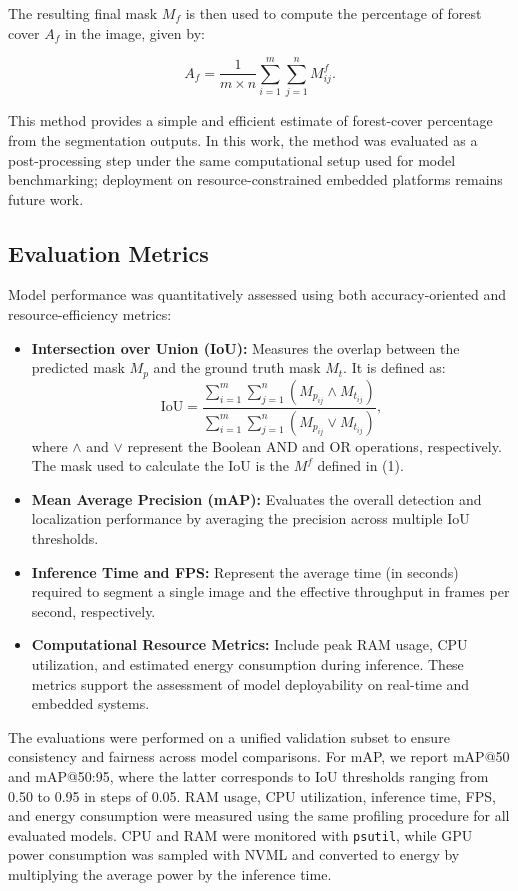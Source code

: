\documentclass[journal,article,submit,pdftex,moreauthors]{Definitions/mdpi}
\begin{document}
The resulting final mask $M_f$ is then used to compute the percentage of forest
cover $A_f$ in the image, given by:

\begin{equation}
    A_f = \frac{1}{m\times n}\sum_{i=1}^{m} \sum_{j=1}^{n} M_{ij}^f.
\end{equation}

This method provides a simple and efficient estimate of forest-cover percentage
from the segmentation outputs. In this work, the method was evaluated as a
post-processing step under the same computational setup used for model
benchmarking; deployment on resource-constrained embedded platforms remains
future work.

\subsection{Evaluation Metrics}

Model performance was quantitatively assessed using both accuracy-oriented and resource-efficiency metrics:
\begin{itemize}
    \item \textbf{Intersection over Union (IoU):} Measures the overlap between the predicted mask $M_p$ and the ground truth mask $M_t$. It is defined as:
    \[
    \text{IoU} = \frac{\sum_{i=1}^{m} \sum_{j=1}^{n} (M_{p_{ij}} \land M_{t_{ij}})}{\sum_{i=1}^{m} \sum_{j=1}^{n} (M_{p_{ij}} \lor M_{t_{ij}})},
    \]
    where $\land$ and $\lor$ represent the Boolean AND and OR operations, respectively. The mask used to calculate the IoU is the $M^f$ defined in (1).
    \item \textbf{Mean Average Precision (mAP):} Evaluates the overall detection and localization performance by averaging the precision across multiple IoU thresholds.
    \item \textbf{Inference Time and FPS:} Represent the average time (in seconds) required to segment a single image and the effective throughput in frames per second, respectively.
    \item \textbf{Computational Resource Metrics:} Include peak RAM usage, CPU utilization, and estimated energy consumption during inference. These metrics support the assessment of model deployability on real-time and embedded systems.
\end{itemize}

The evaluations were performed on a unified validation subset to ensure consistency and fairness across model comparisons.  
For mAP, we report mAP@50 and mAP@50:95, where the latter corresponds to IoU thresholds ranging from 0.50 to 0.95 in steps of 0.05. 
RAM usage, CPU utilization, inference time, FPS, and energy consumption were measured using the same profiling procedure for all evaluated models. CPU and
RAM were monitored with \texttt{psutil}, while GPU power consumption was sampled
with NVML and converted to energy by multiplying the average power by the
inference time.
\end{document}
